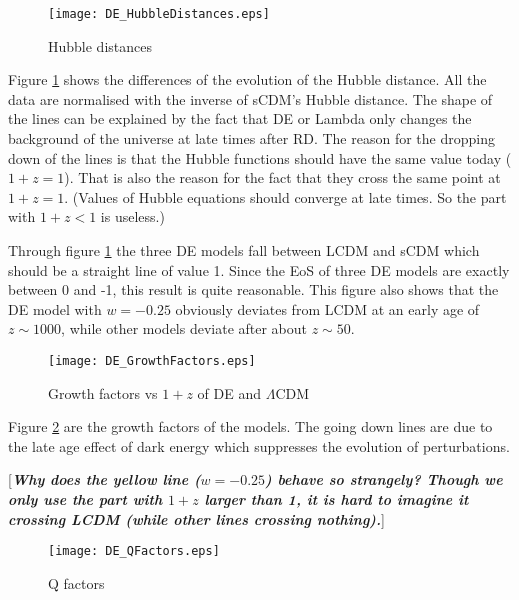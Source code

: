 \begin{figure}[!htbp]
\centering
\texttt{[image: DE\_HubbleDistances.eps]} 
\caption{Hubble distances}\label{fig:DE_HubbleDistances}
\end{figure}


Figure \ref{fig:DE_HubbleDistances} shows the differences of the evolution of the Hubble distance. All the data are normalised with the inverse of sCDM's Hubble distance.
The shape of the lines can be explained by the fact that DE or Lambda only changes the background of the universe at late times after RD. The reason for the dropping down of the lines is that the Hubble functions should have the same value today ($1+z=1$). That is also the reason for the fact that they cross the same point at $1+z=1$. (Values of Hubble equations should converge at late times. So the part with $1+z<1$ is useless.)

Through figure \ref{fig:DE_HubbleDistances} the three DE models fall between LCDM and sCDM which should be a straight line of value 1. Since the EoS of three DE models are exactly between 0 and -1, this result is quite reasonable. This figure also shows that the DE model with $w=-0.25$ obviously deviates from LCDM at an early age of $z\sim 1000$, while other models deviate after about $z\sim 50$.






\begin{figure}[!htbp]
\centering
\texttt{[image: DE\_GrowthFactors.eps]} 
\caption{Growth factors vs $1+z$ of DE and $\Lambda$CDM}\label{fig:DE_GrowthFactors}
\end{figure}


Figure \ref{fig:DE_GrowthFactors} are the growth factors of the models. The going down lines are due to the late age effect of dark energy which suppresses the evolution of perturbations.

[{\color{red}\bf \it Why does the yellow line ($w=-0.25$) behave so strangely? Though we only use the part with $1+z$ larger than 1, it is hard to imagine it crossing LCDM (while other lines crossing nothing).}]






\begin{figure}[!htbp]
\centering
\texttt{[image: DE\_QFactors.eps]} 
\caption{Q factors}\label{fig:DE_QFactors}
\end{figure}



